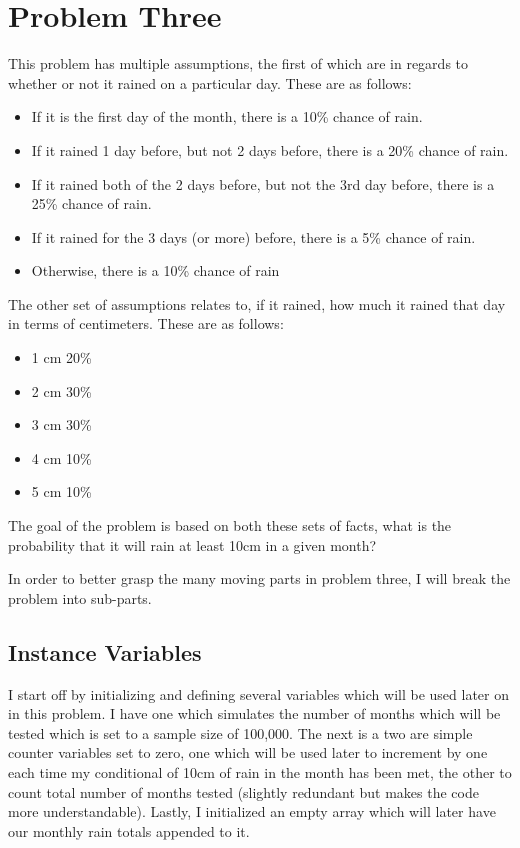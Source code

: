 \documentclass[twocolumn]{revtex4}
\begin{document}
\section{Problem Three}
This problem has multiple assumptions, the first of which are in regards to whether or not it rained on a particular day. These are as follows:
\begin{itemize} %
    \item If it is the first day of the month, there is a 10\% chance of rain.
    \item If it rained 1 day before, but not 2 days before, there is a 20\% chance of rain.
    \item If it rained both of the 2 days before, but not the 3rd day before, there is a 25\% chance of rain.
	\item If it rained for the 3 days (or more) before, there is a 5\% chance of rain.
    \item Otherwise, there is a 10\% chance of rain
\end{itemize}
The other set of assumptions relates to, if it rained, how much it rained that day in terms of centimeters. These are as follows:
\begin{itemize} %
    \item 1 cm 20\% 
    \item 2 cm 30\%
    \item 3 cm 30\%
    \item 4 cm 10\%
    \item 5 cm 10\%
\end{itemize}
The goal of the problem is based on both these sets of facts, what is the probability that it will rain at least 10cm in a given month?

In order to better grasp the many moving parts in problem three, I will break the problem into sub-parts.
\subsection{Instance Variables}
I start off by initializing and defining several variables which will be used later on in this problem. I have one which simulates the number of months which will be tested which is set to a sample size of 100,000. The next is a two are simple counter variables set to zero, one which will be used later to increment by one each time my conditional of 10cm of rain in the month has been met, the other to count total number of months tested (slightly redundant but makes the code more understandable). Lastly, I initialized an empty array which will later have our monthly rain totals appended to it. 
\end{document}
